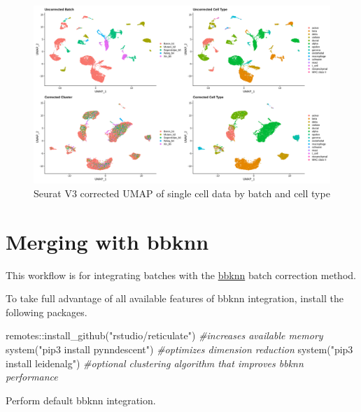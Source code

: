 \documentclass[
]{book}
\newenvironment{Shaded}{\begin{snugshade}}{\end{snugshade}}
\newcommand{\CommentTok}[1]{\textcolor[rgb]{0.56,0.35,0.01}{\textit{#1}}}
\newcommand{\FunctionTok}[1]{\textcolor[rgb]{0.00,0.00,0.00}{#1}}
\newcommand{\NormalTok}[1]{#1}
\newcommand{\SpecialCharTok}[1]{\textcolor[rgb]{0.00,0.00,0.00}{#1}}
\newcommand{\StringTok}[1]{\textcolor[rgb]{0.31,0.60,0.02}{#1}}
\begin{document}
\begin{figure}

{\centering \includegraphics[width=33.33in,height=0.8\textheight]{_book/ensemblemerge_files/images/seurat_integrate} 

}

\caption{Seurat V3 corrected UMAP of single cell data by batch and cell type}\label{fig:unnamed-chunk-13}
\end{figure}

\hypertarget{merging-with-bbknn}{%
\section{Merging with bbknn}\label{merging-with-bbknn}}

This workflow is for integrating batches with the \href{'https://github.com/Teichlab/bbknn'}{bbknn} batch correction method.

To take full advantage of all available features of bbknn integration, install the following packages.

\begin{Shaded}
\begin{Highlighting}[]
\NormalTok{remotes}\SpecialCharTok{::}\FunctionTok{install\_github}\NormalTok{(}\StringTok{"rstudio/reticulate"}\NormalTok{) }\CommentTok{\#increases available memory}
\FunctionTok{system}\NormalTok{(}\StringTok{"pip3 install pynndescent"}\NormalTok{) }\CommentTok{\#optimizes dimension reduction}
\FunctionTok{system}\NormalTok{(}\StringTok{"pip3 install leidenalg"}\NormalTok{) }\CommentTok{\#optional clustering algorithm that improves bbknn performance}
\end{Highlighting}
\end{Shaded}

Perform default bbknn integration.
\end{document}
